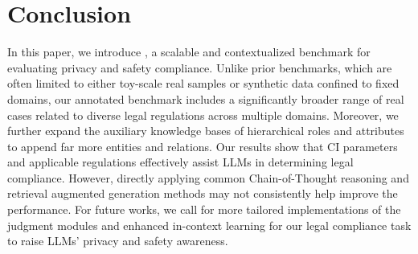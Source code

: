 \section{Conclusion}

In this paper, we introduce \name,  a scalable and contextualized benchmark for evaluating privacy and safety compliance.
Unlike prior benchmarks, which are often limited to either toy-scale real samples or synthetic data confined to fixed domains, our annotated benchmark includes a significantly broader range of real cases related to diverse legal regulations across multiple domains.
Moreover, we further expand the auxiliary knowledge bases of hierarchical roles and attributes to append far more entities and relations.
Our results show that CI parameters and applicable regulations effectively assist LLMs in determining legal compliance.
However, directly applying common Chain-of-Thought reasoning and retrieval augmented generation methods may not consistently help improve the performance.
For future works, we call for more tailored implementations of the judgment modules and enhanced in-context learning for our legal compliance task to raise LLMs' privacy and safety awareness.




 








